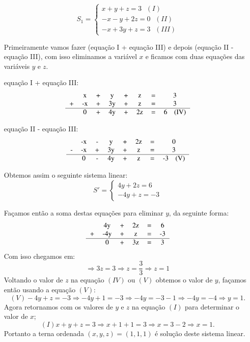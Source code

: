 \begin{exem}
 \[S_1= \begin{cases}
         x + y + z= 3 \ \ \ (I)\\
         -x - y + 2z= 0 \ \ \ (II)\\
         -x + 3y + z= 3 \ \ \ (III)
        \end{cases} \]

 Primeiramente vamos fazer (equação I + equação III) e depois (equação II - equação III), com isso eliminamos a variável $x$ e ficamos com duas equações das variáveis $y$ e $z$.

 equação I + equação III:
 \[\begin{tabular}{cccccccc}
   & x & +  & y & + & z & =  & 3  \\
 + & -x & + & 3y & + & z & = & 3 \\\hline
   & 0 & + & 4y & + & 2z & = & 6 \ \ \ (IV)\\
\end{tabular}\]

equação II - equação III:
\[\begin{tabular}{cccccccc}
   & -x & - & y & + & 2z & = & 0 \\
 - & -x & + & 3y & + & z & = & 3 \\\hline
   & 0 & - & 4y & + & z & = & -3 \ \ \ (V)\\
\end{tabular}\]

Obtemos assim o seguinte sistema linear:
\[S'= \begin{cases}
       4y + 2z = 6 \\
       -4y + z= -3
      \end{cases}\]

 Façamos então a soma destas equações para eliminar $y$, da seguinte forma:
 \[\begin{tabular}{cccccccc}
   & 4y & + & 2z & = & 6 \\
 + & -4y & + & z & = & -3 \\\hline
   & 0 & + & 3z & = & 3 \\
\end{tabular}\]
Com isso chegamos em:
\[\Rightarrow 3z= 3 \Rightarrow z= \frac{3}{3} \Rightarrow z= 1 \]
Voltando o valor de $z$ na equação $(IV)$ ou $(V)$ obtemos o valor de $y$, façamos então usando a equação $(V)$:
\[(V) -4y + z = -3 \Rightarrow -4y + 1 = -3 \Rightarrow -4y = -3 - 1 \Rightarrow -4y = -4 \Rightarrow y = 1.\]
Agora retornamos com os valores de $y$ e $z$ na equação $(I)$ para determinar o valor de $x$;
\[(I) x + y + z= 3 \Rightarrow x + 1 + 1 = 3 \Rightarrow x = 3 - 2 \Rightarrow x = 1.\]
Portanto a terna ordenada $(x, y, z)= (1, 1, 1)$ é solução deste sistema linear.
\fim

\end{exem}

